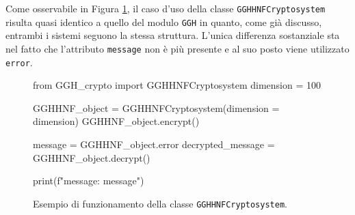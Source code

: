 Come osservabile in Figura \ref{fig:gghhnfmoduleexample}, il caso d'uso della classe 
\texttt{GGHHNFCryptosystem} risulta quasi identico a quello del
modulo \texttt{GGH} in quanto, come già discusso, entrambi i sistemi seguono la stessa struttura.  
L'unica differenza sostanziale sta nel fatto che l'attributo \texttt{message} non è più 
presente e al suo posto viene utilizzato \texttt{error}. 

\begin{figure}[h]
    \begin{python}
        from GGH_crypto import GGHHNFCryptosystem
        dimension = 100

        GGHHNF_object = GGHHNFCryptosystem(dimension = dimension)
        GGHHNF_object.encrypt()

        message = GGHHNF_object.error
        decrypted_message = GGHHNF_object.decrypt()

        print(f"message: {message}")
    \end{python}
    \caption{Esempio di funzionamento della classe \texttt{GGHHNFCryptosystem}.}
    \label{fig:gghhnfmoduleexample}
\end{figure}